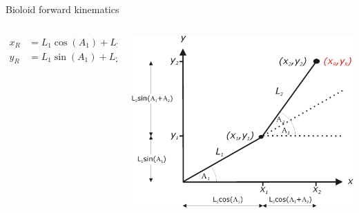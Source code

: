 \documentclass[compress]{beamer}
\begin{document}
\begin{frame}{Bioloid forward kinematics}

    \begin{columns}
        \begin{column}{0.5\linewidth}

            \begin{align*}
                x_R &= L_1 \cos(A_1) + L_2 \cos(A_1+ A_2) \\
                y_R &= L_1 \sin(A_1) + L_2 \sin(A_1+ A_2)
            \end{align*}
        \end{column}
        \begin{column}{0.5\linewidth}

            \begin{center}
                \includegraphics[width=\linewidth]{image33}
            \end{center}
        \end{column}
    \end{columns}


\end{frame}
\end{document}
